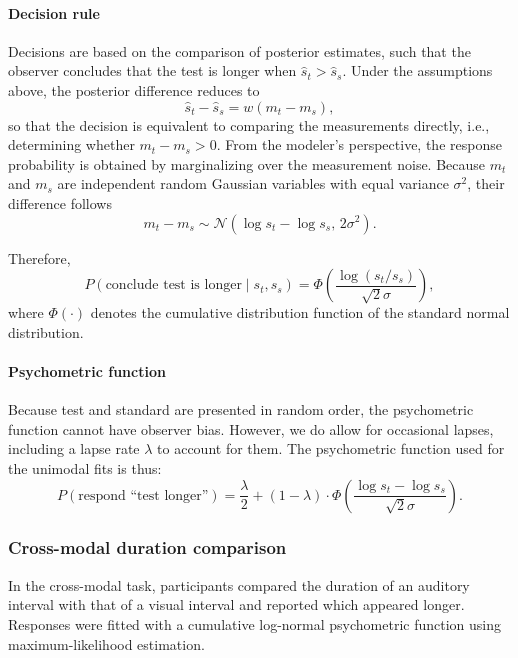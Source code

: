 \documentclass{jov}
\begin{document}
\paragraph{Decision rule}

Decisions are based on the comparison of posterior estimates, such that the observer concludes that the test is longer when $\hat{s}_t > \hat{s}_s$. Under the assumptions above, the posterior difference reduces to
\[
\hat{s}_t - \hat{s}_s = w (m_t - m_s),
\]
so that the decision is equivalent to comparing the measurements directly, i.e., determining whether $m_t - m_s> 0$. From the modeler's perspective, the response probability is obtained by marginalizing over the measurement noise. Because $m_t$ and $m_s$ are independent random Gaussian variables with equal variance $\sigma^2$, their difference follows
\begin{equation}
m_t - m_s
\sim
\mathcal{N}\!\left(
\log s_t - \log s_s,
\, 2\sigma^2
\right).
\end{equation}

Therefore,
\begin{equation}
P(\text{conclude test is longer} \mid s_t, s_s)
=
\Phi\!\left(
\frac{\log(s_t/s_s)}{\sqrt{2}\sigma}
\right),
\end{equation}
where $\Phi(\cdot)$ denotes the cumulative distribution function of the standard normal distribution.

\paragraph{Psychometric function}
Because test and standard are presented in random order, the psychometric function cannot have observer bias. However, we do allow for occasional lapses, including a lapse rate $\lambda$ to account for them. The psychometric function used for the unimodal fits is thus:
\begin{equation}
P(\text{respond ``test longer''}) = \frac{\lambda}{2} + (1-\lambda) \cdot \Phi\left( \frac{\log s_t - \log s_s}{\sqrt{2}\sigma} \right).
\end{equation}

\subsubsection{Cross-modal duration comparison}

In the cross-modal task, participants compared the duration of an auditory interval with that of a visual interval and reported which appeared longer. Responses were fitted with a cumulative log-normal psychometric function using maximum-likelihood estimation.
\end{document}
